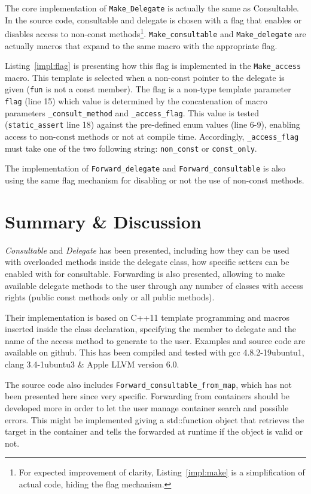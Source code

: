 \documentclass{article}
\begin{document}
The core implementation of \verb+Make_Delegate+ is actually the same as Consultable. In the source code, consultable and delegate is chosen with a flag that enables or disables access to non-const methods\footnote{For expected improvement of clarity, Listing~\ref{impl:make} is a simplification of actual code, hiding the flag mechanism.}. \verb+Make_consultable+ and \verb+Make_delegate+ are actually macros that expand to the same macro with the appropriate flag. 

Listing~\ref{impl:flag} is presenting how this flag is implemented in the \verb+Make_access+ macro. This template is selected when a non-const pointer to the delegate is given (\verb+fun+ is not a const member). The flag is a non-type template parameter \verb+flag+ (line 15) which value is determined by the concatenation of macro parameters \verb+_consult_method+ and \verb+_access_flag+. This value is tested (\verb+static_assert+ line 18) against the pre-defined enum values (line 6-9), enabling access to non-const methods or not at compile time. Accordingly, \verb+_access_flag+ must take one of the two following string: \verb+non_const+ or \verb+const_only+.   
 
The implementation of \verb+Forward_delegate+ and \verb+Forward_consultable+ is also using the same flag mechanism for disabling or not the use of non-const methods. 

\section{Summary \& Discussion}
\textit{Consultable} and \textit{Delegate} has been presented, including how they can be used with overloaded methods inside the delegate class, how specific setters can be enabled with for consultable. Forwarding is also presented, allowing to make available delegate methods to the user through any number of classes with access rights (public const methods only or all public methods). 

Their implementation is based on C++11 template programming and macros inserted inside the class declaration, specifying the member to delegate and the name of the access method to generate to the user. Examples and source code are available on github. This has been compiled and tested with gcc 4.8.2-19ubuntu1, clang 3.4-1ubuntu3 \& Apple LLVM version 6.0.

The source code also includes \verb+Forward_consultable_from_map+, which has not been presented here since very specific. Forwarding from containers should be developed more in order to let the user manage container search and possible errors. This might be implemented giving a std::function object that retrieves the target in the container and tells the forwarded at runtime if the object is valid or not.        
\end{document}

